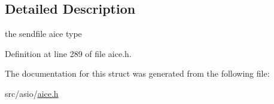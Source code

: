\subsection{Detailed Description}
the sendfile aice type 

Definition at line 289 of file aice.\-h.



The documentation for this struct was generated from the following file\-:\begin{DoxyCompactItemize}
\item 
src/asio/\hyperlink{aice_8h}{aice.\-h}\end{DoxyCompactItemize}
